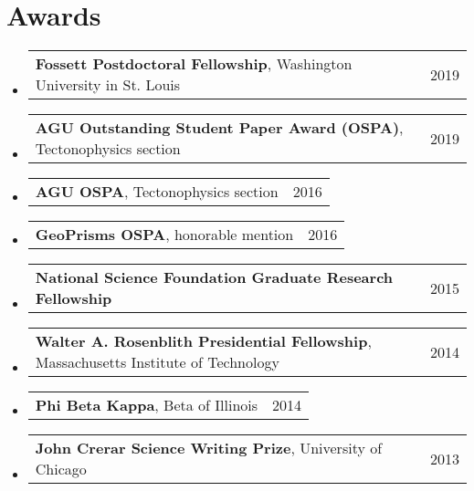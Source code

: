 \documentclass[letterpaper,11pt]{article}
\makeatletter
\newlength\listindent
\newcommand{\resumeSmallThing}[3]{
  \vspace{-2pt}\item
    \begin{tabular*}{0.97\textwidth}[t]{l@{\extracolsep{\fill}}r}
      \textbf{#1}, {#2} & #3\\
    \end{tabular*}\vspace{-14pt}
}
\newcommand{\resumeSmallerThing}[2]{
  \vspace{-2pt}\item
    \begin{tabular*}{0.97\textwidth}[t]{l@{\extracolsep{\fill}}r}
      \textbf{#1} & #2\\
    \end{tabular*}\vspace{-14pt}
}
\newcommand{\resumeSubHeadingListStart}{\begin{itemize}[leftmargin=0.15in, label={}]}
\newcommand{\resumeSubHeadingListEnd}{\end{itemize}}
\makeatother
\begin{document}

\section{Awards}
    \resumeSubHeadingListStart
    \resumeSmallThing
      {Fossett Postdoctoral Fellowship}{Washington University in St. Louis}{2019}
    \resumeSmallThing
      {AGU Outstanding Student Paper Award (OSPA)}{Tectonophysics section}{2019}
    \resumeSmallThing
      {AGU OSPA}{Tectonophysics section}{2016}
    \resumeSmallThing
      {GeoPrisms OSPA}{honorable mention}{2016}
    \resumeSmallerThing
      {National Science Foundation Graduate Research Fellowship}{2015}
    \resumeSmallThing
      {Walter A. Rosenblith Presidential Fellowship}{Massachusetts Institute of Technology}{2014}
    \resumeSmallThing
      {Phi Beta Kappa}{Beta of Illinois}{2014}
    \resumeSmallThing
      {John Crerar Science Writing Prize}{University of Chicago}{2013}
    \resumeSubHeadingListEnd


\end{document}
